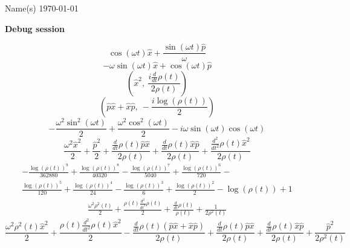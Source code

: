 \documentclass[12pt]{article}
\begin{document}
\noindent Name(s) \hfill \today \\[30pt]
\centerline{ \Large{ \textbf{ Debug session}}}
\begin{equation}
	\cos{\left(\omega t \right)} \hat{x} + \frac{\sin{\left(\omega t \right)} \hat{p}}{\omega}
\end{equation}
\begin{equation*}
	- \omega \sin{\left(\omega t \right)} \hat{x} + \cos{\left(\omega t \right)} \hat{p}
\end{equation*}
\begin{equation*}
	\left( \hat{x}^{2}, \  \frac{i \frac{d}{d t} \rho{\left(t \right)}}{2 \rho{\left(t \right)}}\right)
\end{equation*}
\begin{equation*}
	\left( \hat{p} \hat{x} + \hat{x} \hat{p}, \  - \frac{i \log{\left(\rho{\left(t \right)} \right)}}{2}\right)
\end{equation*}
\begin{equation*}
	- \frac{\omega^{2} \sin^{2}{\left(\omega t \right)}}{2} + \frac{\omega^{2} \cos^{2}{\left(\omega t \right)}}{2} - i \omega \sin{\left(\omega t \right)} \cos{\left(\omega t \right)}
\end{equation*}
\begin{equation*}
	\frac{\omega^{2} \hat{x}^{2}}{2} + \frac{\hat{p}^{2}}{2} + \frac{\frac{d}{d t} \rho{\left(t \right)} \hat{p} \hat{x}}{2 \rho{\left(t \right)}} + \frac{\frac{d}{d t} \rho{\left(t \right)} \hat{x} \hat{p}}{2 \rho{\left(t \right)}} + \frac{\frac{d^{2}}{d t^{2}} \rho{\left(t \right)} \hat{x}^{2}}{2 \rho{\left(t \right)}}
\end{equation*}
\begin{align*}
	- \frac{\log{\left(\rho{\left(t \right)} \right)}^{9}}{362880} + \frac{\log{\left(\rho{\left(t \right)} \right)}^{8}}{40320} - \frac{\log{\left(\rho{\left(t \right)} \right)}^{7}}{5040} + \frac{\log{\left(\rho{\left(t \right)} \right)}^{6}}{720} - \\
	\frac{\log{\left(\rho{\left(t \right)} \right)}^{5}}{120} + \frac{\log{\left(\rho{\left(t \right)} \right)}^{4}}{24} - \frac{\log{\left(\rho{\left(t \right)} \right)}^{3}}{6} + \frac{\log{\left(\rho{\left(t \right)} \right)}^{2}}{2} - \log{\left(\rho{\left(t \right)} \right)} + 1
\end{align*}
\begin{align*}
	\frac{\omega^{2} \rho^{2}{\left(t \right)}}{2} + \frac{\rho{\left(t \right)} \frac{d^{2}}{d t^{2}} \rho{\left(t \right)}}{2} + \frac{\frac{d}{d t} \rho{\left(t \right)}}{\rho{\left(t \right)}} + \frac{1}{2 \rho^{2}{\left(t \right)}}
\end{align*}
\begin{equation*}
	\frac{\omega^{2} \rho^{2}{\left(t \right)} \hat{x}^{2}}{2} + \frac{\rho{\left(t \right)} \frac{d^{2}}{d t^{2}} \rho{\left(t \right)} \hat{x}^{2}}{2} - \frac{\frac{d}{d t} \rho{\left(t \right)} \left(\hat{p} \hat{x} + \hat{x} \hat{p}\right)}{2 \rho{\left(t \right)}} + \frac{\frac{d}{d t} \rho{\left(t \right)} \hat{p} \hat{x}}{2 \rho{\left(t \right)}} + \frac{\frac{d}{d t} \rho{\left(t \right)} \hat{x} \hat{p}}{2 \rho{\left(t \right)}} + \frac{\hat{p}^{2}}{2 \rho^{2}{\left(t \right)}}
\end{equation*}
\end{document}
